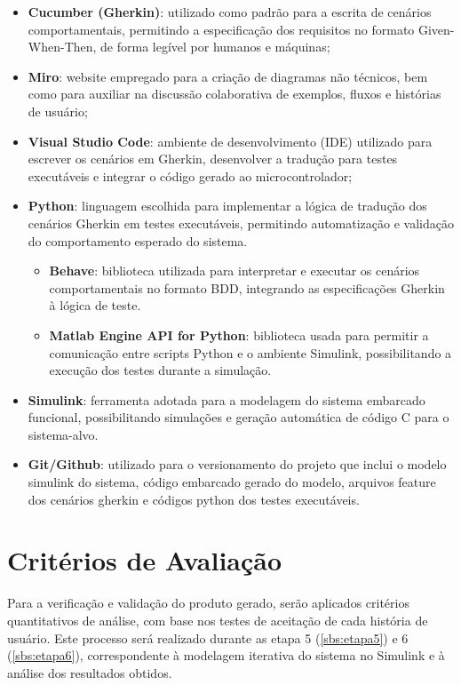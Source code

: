\begin{itemize}
    \item \textbf{Cucumber (Gherkin)}: utilizado como padrão para a escrita de cenários comportamentais, permitindo a especificação dos requisitos no formato Given-When-Then, de forma legível por humanos e máquinas;
    \item \textbf{Miro}: website empregado para a criação de diagramas não técnicos, bem como para auxiliar na discussão colaborativa de exemplos, fluxos e histórias de usuário;
    \item \textbf{Visual Studio Code}: ambiente de desenvolvimento (IDE) utilizado para escrever os cenários em Gherkin, desenvolver a tradução para testes executáveis e integrar o código gerado ao microcontrolador;
    \item \textbf{Python}: linguagem escolhida para implementar a lógica de tradução dos cenários Gherkin em testes executáveis, permitindo automatização e validação do comportamento esperado do sistema.
    \begin{itemize}
        \item \textbf{Behave}: biblioteca utilizada para interpretar e executar os cenários comportamentais no formato BDD, integrando as especificações Gherkin à lógica de teste.
        \item \textbf{Matlab Engine API for Python}: biblioteca usada para permitir a comunicação entre scripts Python e o ambiente Simulink, possibilitando a execução dos testes durante a simulação.
    \end{itemize}    
    \item \textbf{Simulink}: ferramenta adotada para a modelagem do sistema embarcado funcional, possibilitando simulações e geração automática de código C para o sistema-alvo.
    \item \textbf{Git/Github}: utilizado para o versionamento do projeto que inclui o modelo simulink do sistema, código embarcado gerado do modelo, arquivos feature dos cenários gherkin e códigos python dos testes executáveis.

\end{itemize}

\section{\textbf{Critérios de Avaliação}}
Para a verificação e validação do produto gerado, serão aplicados critérios quantitativos de análise, com base nos testes de aceitação de cada história de usuário. Este 
processo será realizado durante as etapa 5 (\ref{sbs:etapa5}) e 6 (\ref{sbs:etapa6}), correspondente à modelagem iterativa do sistema no Simulink e à análise dos 
resultados obtidos.

